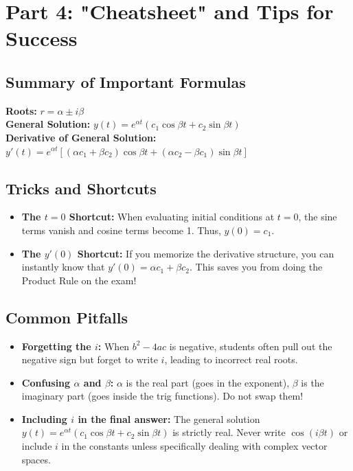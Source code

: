 \documentclass[11pt]{article}
\begin{document}
\section{Part 4: "Cheatsheet" and Tips for Success}

\subsection{Summary of Important Formulas}
\begin{tcolorbox}
\textbf{Roots:} $r = \alpha \pm i\beta$ \\
\textbf{General Solution:} $y(t) = e^{\alpha t}(c_1 \cos \beta t + c_2 \sin \beta t)$ \\
\textbf{Derivative of General Solution:} \\
$y'(t) = e^{\alpha t} [ (\alpha c_1 + \beta c_2)\cos \beta t + (\alpha c_2 - \beta c_1)\sin \beta t ]$
\end{tcolorbox}

\subsection{Tricks and Shortcuts}
\begin{itemize}
    \item \textbf{The $t=0$ Shortcut:} When evaluating initial conditions at $t=0$, the sine terms vanish and cosine terms become 1. Thus, $y(0) = c_1$. 
    \item \textbf{The $y'(0)$ Shortcut:} If you memorize the derivative structure, you can instantly know that $y'(0) = \alpha c_1 + \beta c_2$. This saves you from doing the Product Rule on the exam!
\end{itemize}

\subsection{Common Pitfalls}
\begin{itemize}
    \item \textbf{Forgetting the $i$:} When $b^2 - 4ac$ is negative, students often pull out the negative sign but forget to write $i$, leading to incorrect real roots.
    \item \textbf{Confusing $\alpha$ and $\beta$:} $\alpha$ is the real part (goes in the exponent), $\beta$ is the imaginary part (goes inside the trig functions). Do not swap them!
    \item \textbf{Including $i$ in the final answer:} The general solution $y(t) = e^{\alpha t}(c_1 \cos \beta t + c_2 \sin \beta t)$ is strictly real. Never write $\cos(i\beta t)$ or include $i$ in the constants unless specifically dealing with complex vector spaces.
\end{itemize}
\end{document}
